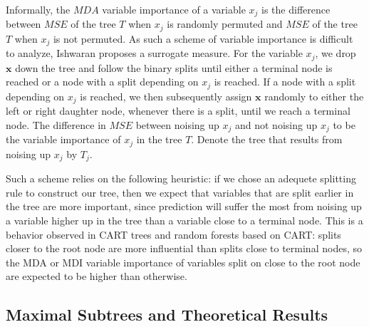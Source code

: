 \documentclass[12pt,twoside]{reedthesis}
\theoremstyle{definition}
\theoremstyle{definition}
\theoremstyle{definition}
\theoremstyle{remark}
\begin{document}
Informally, the \(MDA\) variable importance of a variable \(x_j\) is the
difference between \(MSE\) of the tree \(T\) when \(x_j\) is randomly
permuted and \(MSE\) of the tree \(T\) when \(x_j\) is not permuted. As
such a scheme of variable importance is difficult to analyze, Ishwaran
proposes a surrogate measure. For the variable \(x_j\), we drop
\(\mathbf{x}\) down the tree and follow the binary splits until either a
terminal node is reached or a node with a split depending on \(x_j\) is
reached. If a node with a split depending on \(x_j\) is reached, we then
subsequently assign \(\mathbf{x}\) randomly to either the left or right
daughter node, whenever there is a split, until we reach a terminal
node. The difference in \(MSE\) between noising up \(x_j\) and not
noising up \(x_j\) to be the variable importance of \(x_j\) in the tree
\(T\). Denote the tree that results from noising up \(x_j\) by \(T_j\).
\par

Such a scheme relies on the following heuristic: if we chose an adequete
splitting rule to construct our tree, then we expect that variables that
are split earlier in the tree are more important, since prediction will
suffer the most from noising up a variable higher up in the tree than a
variable close to a terminal node. This is a behavior observed in CART
trees and random forests based on CART: splits closer to the root node
are more influential than splits close to terminal nodes, so the MDA or
MDI variable importance of variables split on close to the root node are
expected to be higher than otherwise. \par

\subsection{Maximal Subtrees and Theoretical
Results}\label{maximal-subtrees-and-theoretical-results}
\end{document}
